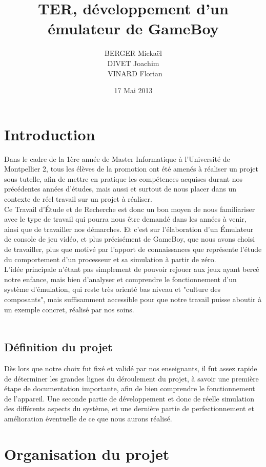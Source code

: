 \documentclass{report}
\title{TER, développement d'un émulateur de GameBoy}
\author{BERGER Mickaël \\ DIVET Joachim \\ VINARD Florian}
\date{17 Mai 2013}
\begin{document}
\maketitle

\tableofcontents
\chapter{Introduction}
	Dans le cadre de la 1ère année de Master Informatique à l'Université de Montpellier
	2, tous les élèves de la promotion ont été amenés à réaliser un projet
	sous tutelle, afin de mettre en pratique les compétences acquises
	durant nos précédentes années d'études, mais aussi et surtout de nous
	placer dans un contexte de réel travail sur un projet à réaliser.\\
	Ce Travail d'Étude et de Recherche est donc un bon moyen de nous
	familiariser avec le type de travail qui pourra nous être demandé dans
	les années à venir, ainsi que de travailler nos démarches.
	Et c'est sur l'élaboration d'un Émulateur de console de jeu vidéo, et plus précisément de GameBoy,
	que nous avons choisi de travailler, plus que motivé par l'apport de
	connaissances que représente l'étude du comportement d'un processeur
	et sa simulation à partir de zéro.
	\\
	L'idée principale n'étant pas simplement de pouvoir rejouer aux jeux
	ayant bercé notre enfance, mais bien d'analyser et comprendre le
	fonctionnement d'un système d'émulation, qui reste très orienté bas
	niveau et "culture des composants", mais suffisamment accessible pour
	que notre travail puisse aboutir à un exemple concret, réalisé par nos
	soins.\\
	\\

\section{Définition du projet}
	Dès lors que notre choix fut fixé et validé par nos enseignants, il
	fut assez rapide de déterminer les grandes lignes du déroulement du
	projet, à savoir une première étape de documentation importante, afin
	de bien comprendre le fonctionnement de l'appareil. Une seconde partie
	de développement et donc de réelle simulation des différents aspects
	du système, et une dernière partie de perfectionnement et
	amélioration éventuelle de ce que nous aurons réalisé.

\chapter{Organisation du projet}
\end{document}
